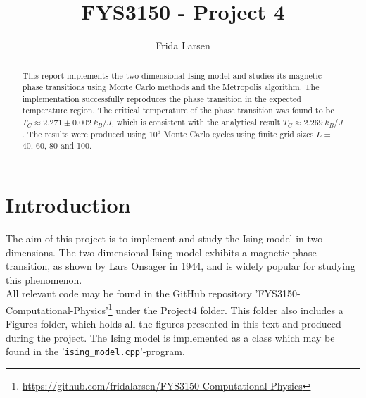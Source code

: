 \documentclass[notitlepage, reprint, nofootinbib]{revtex4-1}
\begin{document}
\title{FYS3150 - Project 4}
\author{Frida Larsen}

\begin{abstract}
This report implements the two dimensional Ising model and studies its magnetic phase transitions using Monte Carlo methods and the Metropolis algorithm. The implementation successfully reproduces the phase transition in the expected temperature region. The critical temperature of the phase transition was found to be $T_C\approx 2.271\pm0.002\ k_B/J$, which is consistent with the analytical result $T_C\approx 2.269\ k_B/J$. The results were produced using $10^6$ Monte Carlo cycles using finite grid sizes $L=$40, 60, 80 and 100. 
\end{abstract}

\maketitle

\section{Introduction}
The aim of this project is to implement and study the Ising model in two dimensions. The two dimensional Ising model exhibits a magnetic phase transition, as shown by Lars Onsager in 1944\cite{Onsager}, and is widely popular for studying this phenomenon.\\[2mm]
All relevant code may be found in the GitHub repository 'FYS3150-Computational-Physics'\footnote{\href{GitHub Repository}{https://github.com/fridalarsen/FYS3150-Computational-Physics}} under the Project4 folder. This folder also includes a Figures folder, which holds all the figures presented in this text and produced during the project. The Ising model is implemented as a class which may be found in the '\texttt{ising\_model.cpp}'-program.
\end{document}
